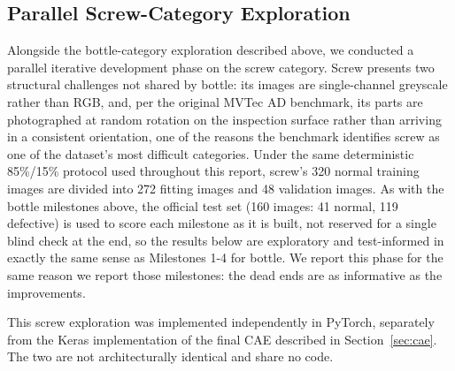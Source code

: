 %
%
%   
%
%
%

\subsection{Parallel Screw-Category Exploration}
\label{subsec:screw-exploration}

Alongside the bottle-category exploration described above, we conducted a
parallel iterative development phase on the screw category. Screw presents
two structural challenges not shared by bottle: its images are
single-channel greyscale rather than RGB, and, per the original MVTec AD
benchmark, its parts are photographed at random rotation on the inspection
surface rather than arriving in a consistent orientation, one of the
reasons the benchmark identifies screw as one of the dataset's most
difficult categories. Under the same deterministic 85\%/15\% protocol used
throughout this report, screw's 320 normal training images are divided
into 272 fitting images and 48 validation images. As with the bottle
milestones above, the official test set (160 images: 41 normal, 119
defective) is used to score each milestone as it is built, not reserved
for a single blind check at the end, so the results below are exploratory
and test-informed in exactly the same sense as Milestones 1-4 for bottle.
We report this phase for the same reason we report those milestones: the
dead ends are as informative as the improvements.

This screw exploration was implemented independently in PyTorch, separately
from the Keras implementation of the final CAE described in
Section~\ref{sec:cae}. The two are not architecturally identical and share no code.


